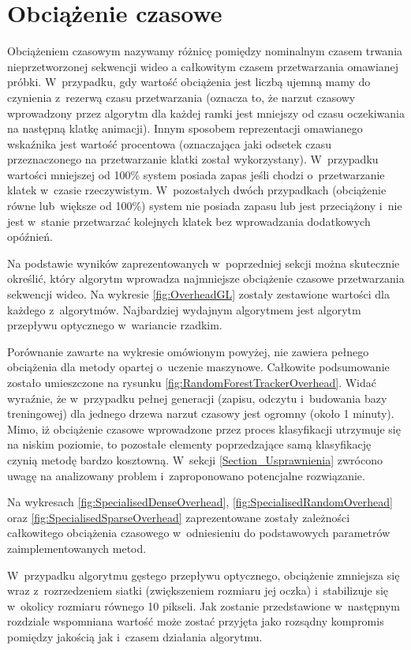   \section{Obciążenie czasowe}\label{Section_Overhead}
    Obciążeniem czasowym nazywamy różnicę pomiędzy nominalnym czasem trwania nieprzetworzonej sekwencji wideo a całkowitym czasem przetwarzania omawianej próbki. W~przypadku, gdy wartość obciążenia jest liczbą ujemną mamy do czynienia z~rezerwą czasu przetwarzania (oznacza to, że narzut czasowy wprowadzony przez algorytm dla każdej ramki jest mniejszy od czasu oczekiwania na następną klatkę animacji). Innym sposobem reprezentacji omawianego wskaźnika jest wartość procentowa (oznaczająca jaki odsetek czasu przeznaczonego na przetwarzanie klatki został wykorzystany). W~przypadku wartości mniejszej od 100\% system posiada zapas jeśli chodzi o~przetwarzanie klatek w~czasie rzeczywistym. W~pozostałych dwóch przypadkach (obciążenie równe lub~większe od 100\%) system nie posiada zapasu lub jest przeciążony i~nie jest w~stanie przetwarzać kolejnych klatek bez wprowadzania dodatkowych opóźnień.

    Na podstawie wyników zaprezentowanych w~poprzedniej sekcji można skutecznie określić, który algorytm wprowadza najmniejsze obciążenie czasowe przetwarzania sekwencji wideo. Na wykresie \ref{fig:OverheadGL} zostały zestawione wartości dla każdego z~algorytmów. Najbardziej wydajnym algorytmem jest algorytm przepływu optycznego w~wariancie rzadkim.

    Porównanie zawarte na wykresie omówionym powyżej, nie zawiera pełnego obciążenia dla metody opartej o~uczenie maszynowe. Całkowite podsumowanie zostało umieszczone na rysunku \ref{fig:RandomForestTrackerOverhead}. Widać wyraźnie, że w~przypadku pełnej generacji (zapisu, odczytu i~budowania bazy treningowej) dla jednego drzewa narzut czasowy jest ogromny (około 1 minuty). Mimo, iż obciążenie czasowe wprowadzone przez proces klasyfikacji utrzymuje się na niskim poziomie, to pozostałe elementy poprzedzające samą klasyfikację czynią metodę bardzo kosztowną. W~sekcji \ref{Section_Usprawnienia} zwrócono uwagę na analizowany problem i~zaproponowano potencjalne rozwiązanie.

    Na wykresach \ref{fig:SpecialisedDenseOverhead}, \ref{fig:SpecialisedRandomOverhead} oraz \ref{fig:SpecialisedSparseOverhead} zaprezentowane zostały zależności całkowitego obciążenia czasowego w~odniesieniu do podstawowych parametrów zaimplementowanych metod.

    W~przypadku algorytmu gęstego przepływu optycznego, obciążenie zmniejsza się wraz z~rozrzedzeniem siatki (zwiększeniem rozmiaru jej oczka) i~stabilizuje się w~okolicy rozmiaru równego 10 pikseli. Jak zostanie przedstawione w~następnym rozdziale wspomniana wartość może zostać przyjęta jako rozsądny kompromis pomiędzy jakością jak i~czasem działania algorytmu.

